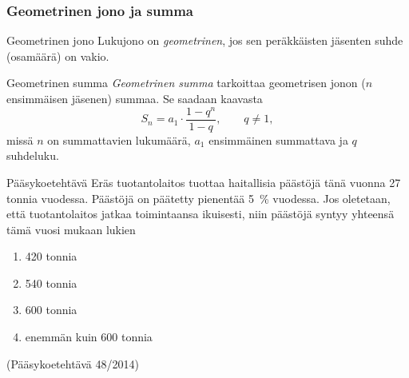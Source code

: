 \documentclass{beamer}\usepackage[]{graphicx}\usepackage[]{color}
\theoremstyle{remark}
\begin{document}
\begin{frame}
    \frametitle{Geometrinen jono ja summa}
    \pause
    \begin{block}{Geometrinen jono}
        Lukujono on \emph{geometrinen}, jos sen peräkkäisten jäsenten suhde (osamäärä) on vakio.
    \end{block}
    \pause
    \begin{block}{Geometrinen summa}
        \emph{Geometrinen summa} tarkoittaa geometrisen jonon ($n$ ensimmäisen jäsenen) summaa. Se saadaan kaavasta
        \[
            S_n = a_1\cdot \frac{1-q^n}{1-q}, \qquad q\neq 1,
        \] \pause
        missä \(n\) on summattavien lukumäärä,
        \pause \(a_1\) ensimmäinen summattava
        \pause ja \(q\) suhdeluku.
    \end{block}
\end{frame}

\begin{frame}
  \begin{block}{Pääsykoetehtävä}
    Eräs tuotantolaitos tuottaa haitallisia päästöjä tänä vuonna 27 tonnia vuodessa.
Päästöjä on päätetty pienentää 5~\% vuodessa. Jos oletetaan, että tuotantolaitos jatkaa
toimintaansa ikuisesti, niin päästöjä syntyy yhteensä tämä vuosi mukaan lukien
    \begin{enumerate}
      \item 420 tonnia
      \item 540 tonnia
      \item 600 tonnia
      \item enemmän kuin 600 tonnia
    \end{enumerate}
    (Pääsykoetehtävä 48/2014)
  \end{block}
\end{frame}
\end{document}
